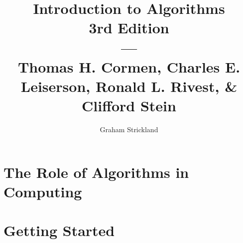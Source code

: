 \documentclass{article}
\title{
    Introduction to Algorithms\\3rd Edition\\---\\
    Thomas H. Cormen, Charles E. Leiserson, Ronald L. Rivest, \& Clifford Stein
}
\author{Graham Strickland}
\begin{document}
\maketitle  

\section{The Role of Algorithms in Computing}


\section{Getting Started}

\end{document}
